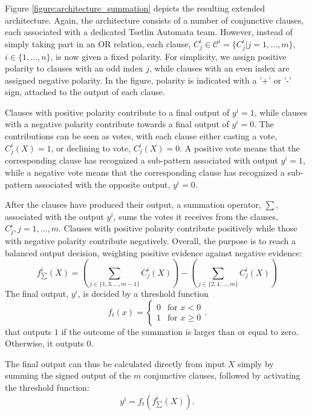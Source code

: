\documentclass[11pt,a4paper]{article}
\newcommand{\True}{\mbox{1}}
\newcommand{\False}{\mbox{0}}
\begin{document}
Figure \ref{figure:architecture_summation} depicts the resulting extended architecture. Again, the architecture consists of a number of conjunctive clauses, each associated with a dedicated Tsetlin Automata team. However, instead of simply taking part in an OR relation, each clause, $C_j^i \in \mathcal{C}^ i = \{C^i_j | j=1, \ldots, m\}$, $i \in \{1, \ldots, n\}$, is now given a fixed polarity. For simplicity, we assign positive polarity to clauses with an odd index $j$, while clauses with an even index are assigned negative polarity. In the figure, polarity is indicated with a '+' or '-'  sign, attached to the output of each clause.

Clauses with positive polarity contribute to a final output of $y^i = \True$, while clauses with a negative polarity contribute towards a final output of $y^i = \False$. The contributions can be seen as votes, with each clause either casting a vote, $C_j^i(X) = \True$, or declining to vote, $C_j^i(X) = \False$. A positive vote means that the corresponding clause has recognized a sub-pattern associated with output $y^i = \True$, while a negative vote means that the corresponding clause has recognized a sub-pattern associated with the opposite output, $y^i = \False$.

After the clauses have produced their output, a summation operator, $\sum$, associated with the output $y^i$, sums the votes it receives from the clauses, $C_j^i, j = 1, \ldots, m$. Clauses with positive polarity contribute positively while those with negative polarity contribute negatively. Overall, the purpose is to reach a balanced output decision, weighting positive evidence against negative evidence:
\begin{equation}
\label{eqn:summation}
    f^i_{\sum}(X) = \left( \sum_{j \in \{1, 3, \ldots, m-1\}} C_j^i(X) \right) - \left(\sum_{j \in \{2, 4, \ldots, m\}}  C_j^i(X) \right)
\end{equation}
The final output, $y^i$, is decided by a threshold function
\[{\displaystyle f_t(x)={\begin{cases}\False&{\text{for }}x<0\\\True&{\text{for }}x\geq 0\end{cases}}}.\]
that outputs $\True$ if the outcome of the summation is larger than or equal to zero. Otherwise, it outputs $\False$.

The final output can thus be calculated directly from input $X$ simply by summing the signed output of the $m$ conjunctive clauses, followed by activating the threshold function:
\begin{equation}
y^i = f_t(f^i_{\sum}(X)).
\end{equation}
\end{document}
